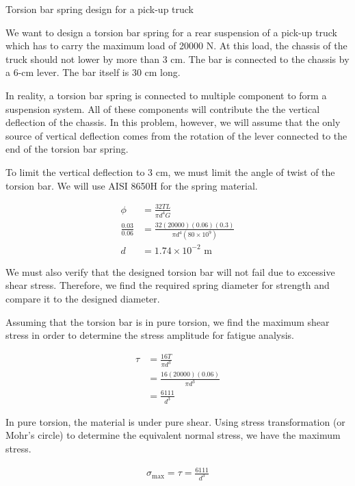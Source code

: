 \documentclass[
10pt,
a4paper,
openany,
svgnames,
]{book}
\begin{document}
\begin{example} Torsion bar spring design for a pick-up truck

  We want to design a torsion bar spring for a rear suspension of a pick-up truck which has to carry the maximum load of 20000 N. At this load, the chassis of the truck should not lower by more than 3 cm. The bar is connected to the chassis by a 6-cm lever. The bar itself is 30 cm long.
  
\end{example}
\begin{solution}

  In reality, a torsion bar spring is connected to multiple component to form a suspension system. All of these components will contribute the the vertical deflection of the chassis. In this problem, however, we will assume that the only source of vertical deflection comes from the rotation of the lever connected to the end of the torsion bar spring.

  To limit the vertical deflection to 3 cm, we must limit the angle of twist of the torsion bar. We will use AISI 8650H for the spring material.

  \begin{align*}
    \phi &= \frac{32TL}{\pi d^4 G} \\
    \frac{0.03}{0.06}  &= \frac{32(20000)(0.06)(0.3)}{\pi d^4 (80 \times 10^9)} \\
    d &= 1.74 \times 10^{-2} \text{ m}
  \end{align*}

  We must also verify that the designed torsion bar will not fail due to excessive shear stress. Therefore, we find the required spring diameter for strength and compare it to the designed diameter.

  Assuming that the torsion bar is in pure torsion, we find the maximum shear stress in order to determine the stress amplitude for fatigue analysis.

  \begin{align*}
    \tau  &= \frac{16T}{\pi d^3} \\
          &= \frac{16(20000)(0.06)}{\pi d^3} \\
          &= \frac{6111}{d^3}
  \end{align*}

  In pure torsion, the material is under pure shear. Using stress transformation (or Mohr's circle) to determine the equivalent normal stress, we have the maximum stress.

  \begin{gather*}
    \sigma_{\max} = \tau = \frac{6111}{d^3}
  \end{gather*}


\end{solution}
\end{document}
